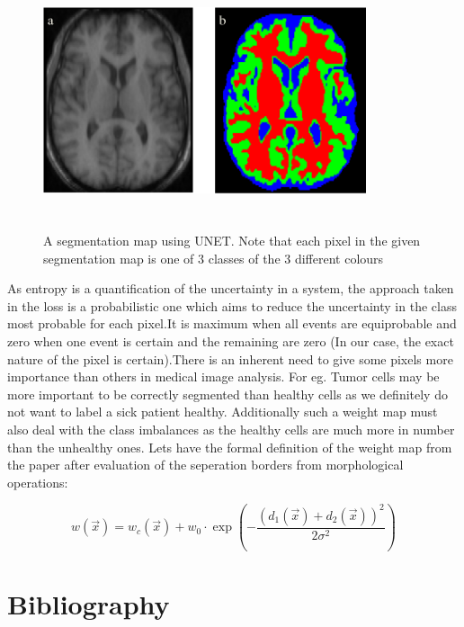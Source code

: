 \documentclass[19pt]{article}
\begin{document}
\begin{center}
    \begin{figure}[!h!t!b]
        \centerline{\includegraphics[width=95mm,height=75mm]{images/segmapunet.png}}
        \caption{A segmentation map using UNET. Note that each pixel in the given segmentation map is one of 3 classes of the 3 different colours}
        \label{fig:7}
    \end{figure}
\end{center}

As entropy is a quantification of the uncertainty in a system, the approach taken in the loss is a probabilistic one which aims to reduce the uncertainty in the class most probable for each pixel.It is maximum when all events are equiprobable and zero when one event is certain and the remaining are zero (In our case, the exact nature of the pixel is certain).There is an inherent need to give some pixels more importance than others in medical image analysis. For eg. Tumor cells may be more important to be correctly segmented than healthy cells as we definitely do not want to label a sick patient healthy. Additionally such a weight map must also deal with the class imbalances as the healthy cells are much more in number than the unhealthy ones. Lets have the formal definition of the weight map from the paper after evaluation of the seperation borders from morphological operations:

\begin{equation} 
    \label{weightmap}
    w(\vec{x}) = w_c(\vec{x}) + w_0 \cdot \exp\left( - \frac{(d_1(\vec{x}) + d_2(\vec{x}))^2}{2\sigma^2}\right ) 
\end{equation}
\newpage
\section{Bibliography}
  
  


\end{document}
